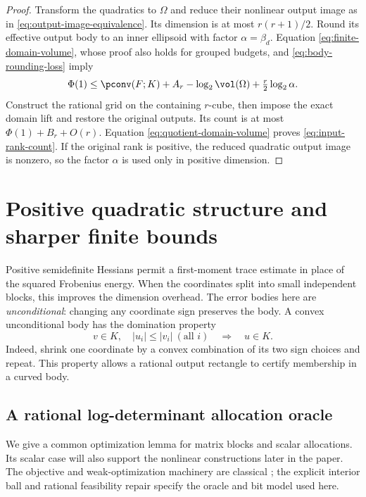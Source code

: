 \begin{proof}
Transform the quadratics to $\Omega$ and reduce their nonlinear output
image as in \eqref{eq:output-image-equivalence}. Its dimension is at
most $r(r+1)/2$. Round its effective output body to an inner ellipsoid
with factor $\alpha=\beta_d$. Equation \eqref{eq:finite-domain-volume},
whose proof also holds for grouped budgets, and
\eqref{eq:body-rounding-loss} imply
\[
 \Phi(1)\le\pconv(F;K)+A_r-\log_2\vol(\Omega)
                           +\tfrac r2\log_2\alpha.
\]
Construct the rational grid on the containing $r$-cube, then impose the
exact domain lift and restore the original outputs. Its count is at
most $\Phi(1)+B_r+O(r)$. Equation \eqref{eq:quotient-domain-volume}
proves \eqref{eq:input-rank-count}. If the original rank is positive,
the reduced quadratic output image is nonzero, so the factor $\alpha$
is used only in positive dimension.
\end{proof}

\section{Positive quadratic structure and sharper finite bounds}\label{sec:psd-structure}

Positive semidefinite Hessians permit a first-moment trace estimate in
place of the squared Frobenius energy. When the coordinates split into
small independent blocks, this improves the dimension overhead. The
error bodies here are \emph{unconditional}: changing any coordinate sign
preserves the body. A convex unconditional body has the domination
property
\begin{equation}\label{eq:unconditional-domination}
 v\in K,\quad |u_i|\le|v_i|\ (\text{all }i)\quad\Longrightarrow\quad u\in K.
\end{equation}
Indeed, shrink one coordinate by a convex combination of its two sign
choices and repeat. This property allows a rational output rectangle to
certify membership in a curved body.

\subsection{A rational log-determinant allocation oracle}

We give a common optimization lemma for matrix blocks and scalar
allocations. Its scalar case will also support the nonlinear constructions
later in the paper. The objective and weak-optimization machinery are
classical \citep{vandenberghe1998,gls1981}; the explicit interior ball
and rational feasibility repair specify the oracle and bit model used here.

